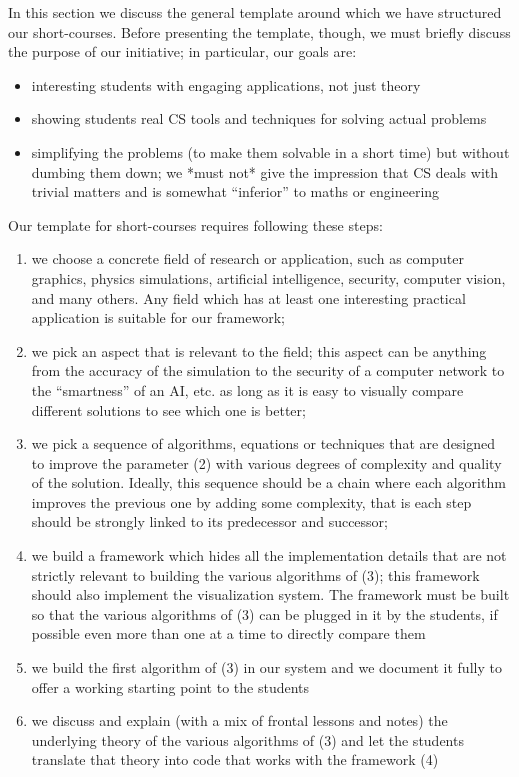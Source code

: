 
In this section we discuss the general template around which we have structured our short-courses. Before presenting the template, though, we must briefly discuss the purpose of our initiative; in particular, our goals are:
\begin{itemize}
\item interesting students with engaging applications, not just theory
\item showing students real CS tools and techniques for solving actual problems
\item simplifying the problems (to make them solvable in a short time) but without dumbing them down; we *must not* give the impression that CS deals with trivial matters and is somewhat ``inferior'' to maths or engineering
\end{itemize}

Our template for short-courses requires following these steps:
\begin{enumerate}
\item we choose a concrete field of research or application, such as computer graphics, physics simulations, artificial intelligence, security, computer vision, and many others. Any field which has at least one interesting practical application is suitable for our framework;
\item we pick an aspect that is relevant to the field; this aspect can be anything from the accuracy of the simulation to the security of a computer network to the ``smartness'' of an AI, etc. as long as it is easy to visually compare different solutions to see which one is better;
\item we pick a sequence of algorithms, equations or techniques that are designed to improve the parameter (2) with various degrees of complexity and quality of the solution. Ideally, this sequence should be a chain where each algorithm improves the  previous one by adding some complexity, that is each step should be strongly linked to its predecessor and successor;
\item we build a framework which hides all the implementation details that are not strictly relevant to building the various algorithms of (3); this framework should also implement the visualization system. The framework must be built so that the various algorithms of (3) can be plugged in it by the students, if possible even more than one at a time to directly compare them
\item we build the first algorithm of (3) in our system and we document it fully to offer a working starting point to the students
\item we discuss and explain (with a mix of frontal lessons and notes) the underlying theory of the various algorithms of (3) and let the students translate that theory into code that works with the framework (4)
\end{enumerate}

